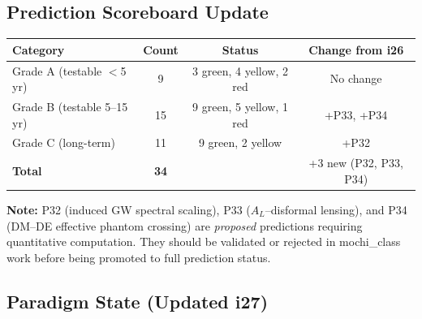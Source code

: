 \documentclass[11pt,a4paper]{article}
\begin{document}
\subsection{Prediction Scoreboard Update}

\begin{center}
\begin{tabular}{lccc}
\toprule
\textbf{Category} & \textbf{Count} & \textbf{Status} & \textbf{Change from i26} \\
\midrule
Grade A (testable $<$5 yr) & 9 & 3 green, 4 yellow, 2 red & No change \\
Grade B (testable 5--15 yr) & 15 & 9 green, 5 yellow, 1 red & +P33, +P34 \\
Grade C (long-term) & 11 & 9 green, 2 yellow & +P32 \\
\midrule
\textbf{Total} & \textbf{34} & & +3 new (P32, P33, P34) \\
\bottomrule
\end{tabular}
\end{center}

\textbf{Note:} P32 (induced GW spectral scaling), P33 ($A_L$--disformal lensing), and P34 (DM--DE effective phantom crossing) are \emph{proposed} predictions requiring quantitative computation. They should be validated or rejected in mochi\_class work before being promoted to full prediction status.

\subsection{Paradigm State (Updated i27)}
\end{document}
